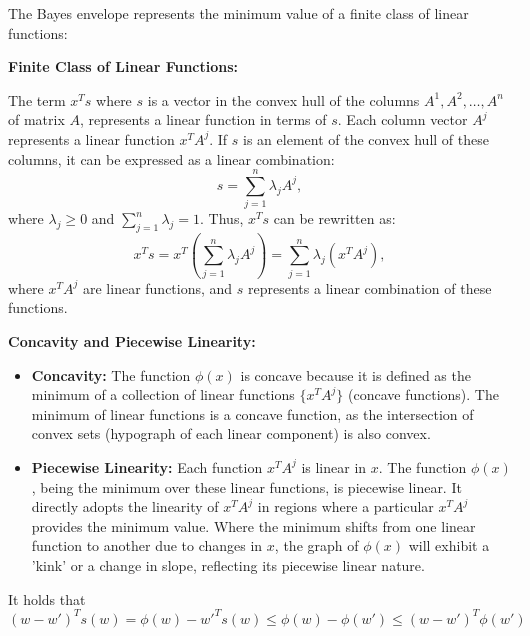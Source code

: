 \documentclass[11pt]{article}
\theoremstyle{boldStyle}
\begin{document}
The Bayes envelope represents the minimum value of a finite class of linear functions:

\textbf{Finite Class of Linear Functions:}

The term \(x^T s\) where \(s\) is a vector in the convex hull of the columns \(A^1, A^2, \ldots, A^n\) of matrix \(A\), represents a linear function in terms of \(s\). Each column vector \(A^j\) represents a linear function \(x^T A^j\). If \(s\) is an element of the convex hull of these columns, it can be expressed as a linear combination:
\[
s = \sum_{j=1}^n \lambda_j A^j,
\]
where \(\lambda_j \geq 0\) and \(\sum_{j=1}^n \lambda_j = 1\). Thus, \(x^T s\) can be rewritten as:
\[
x^T s = x^T \left(\sum_{j=1}^n \lambda_j A^j\right) = \sum_{j=1}^n \lambda_j (x^T A^j),
\]
where \(x^T A^j\) are linear functions, and \(s\) represents a linear combination of these functions.

\textbf{Concavity and Piecewise Linearity:}

\begin{itemize}
    \item \textbf{Concavity:} The function \(\phi(x)\) is concave because it is defined as the minimum of a collection of 
        linear functions \(\{x^T A^j\}\) (concave functions).
        The minimum of linear functions is a concave function, as the intersection of convex sets (hypograph of each linear component) is also convex.

    \item \textbf{Piecewise Linearity:} Each function \(x^T A^j\) is linear in \(x\). 
        The function \(\phi(x)\), being the minimum over these linear functions, is piecewise linear. 
        It directly adopts the linearity of \(x^T A^j\) in regions where a particular \(x^T A^j\) provides the minimum value. 
        Where the minimum shifts from one linear function to another due to changes in \(x\), the graph of \(\phi(x)\) will exhibit 
        a 'kink' or a change in slope, reflecting its piecewise linear nature.
\end{itemize}


It holds that 
\begin{equation}
    (w - w')^T s(w) = \phi(w) - w'^T s(w) \leq \phi(w) - \phi(w') \leq (w - w')^T \phi(w')
\end{equation}
\end{document}
